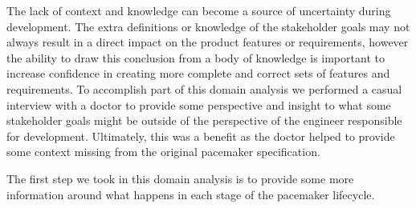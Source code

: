 The lack of context and knowledge can become a source of uncertainty during development. The extra definitions or knowledge of the stakeholder goals may not always result in a direct impact on the product features or requirements, however the ability to draw this conclusion from a body of knowledge is important to increase confidence in creating more complete and correct sets of features and requirements. To accomplish part of this domain analysis we performed a casual interview with a doctor to provide some perspective and insight to what some stakeholder goals might be outside of the perspective of the engineer responsible for development. Ultimately, this was a benefit as the doctor helped to provide some context missing from the original pacemaker specification.




The first step we took in this domain analysis is to provide some more information around what happens in each stage of the pacemaker lifecycle.

